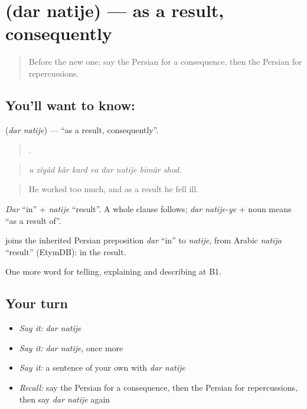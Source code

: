 \section[\texorpdfstring{\fa{در} \fa{نتیجه} (dar natije)}{در نتیجه (dar natije)}]{  (dar natije) — as a result, consequently}

\label{lesson:FA-C370-dar-natije}



\begin{quote}
Before the new one: say the Persian for a consequence, then the Persian for repercussions.
\end{quote}

\subsection*{You'll want to know:  }
\textbf{ } (\emph{dar natije}) — \textquotedblleft{}as a result, consequently\textquotedblright{}.

\begin{quote}
        .
\end{quote}

\begin{quote}
\emph{u ziyâd kâr kard va dar natije bimâr shod.}
\end{quote}

\begin{quote}
He worked too much, and as a result he fell ill.
\end{quote}

\emph{Dar} \textquotedblleft{}in\textquotedblright{} + \emph{natije} \textquotedblleft{}result\textquotedblright{}. A whole clause follows; \emph{dar natije-ye} + noun means \textquotedblleft{}as a result of\textquotedblright{}.

\begin{cousinweb}
\textbf{ } joins the inherited Persian preposition \emph{dar} \textquotedblleft{}in\textquotedblright{} to \emph{natije}, from Arabic \emph{natīja} \textquotedblleft{}result\textquotedblright{} (EtymDB): in the result.
\end{cousinweb}

\begin{grammarlens}[title={What you've built}]
One more word for telling, explaining and describing at B1.
\end{grammarlens}

\subsection*{Your turn}
\begin{itemize}
\raggedright
  \item \emph{Say it:} \emph{dar natije}
  \item \emph{Say it:} \emph{dar natije}, once more
  \item \emph{Say it:} a sentence of your own with \emph{dar natije}
  \item \emph{Recall:} say the Persian for a consequence, then the Persian for repercussions, then say \emph{dar natije} again
\end{itemize}

